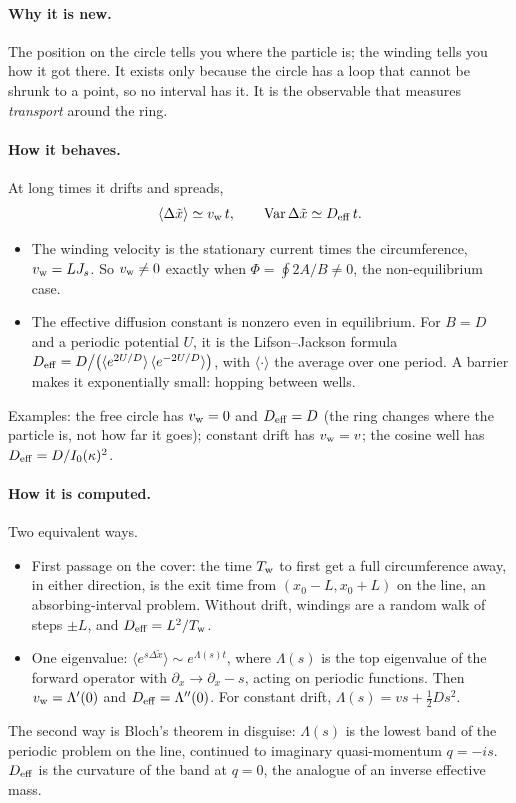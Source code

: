 \documentclass[11pt]{article}
\begin{document}
\paragraph{Why it is new.} The position on the circle tells you where the particle is; the winding tells you how it got
there. It exists only because the circle has a loop that cannot be shrunk to a point, so no interval has it. It is the
observable that measures \emph{transport} around the ring.

\paragraph{How it behaves.} At long times it drifts and spreads,
\[
  \langle\Delta\tilde x\rangle\simeq v_{\rm w}\,t,\qquad \operatorname{Var}\Delta\tilde x\simeq D_{\rm eff}\,t .
\]
\begin{itemize}
  \item The winding velocity is the stationary current times the circumference, $v_{\rm w}=LJ_s$. So $v_{\rm w}\neq0$
        exactly when $\Phi=\oint2A/B\neq0$, the non-equilibrium case.
  \item The effective diffusion constant is nonzero even in equilibrium. For $B=D$ and a periodic potential $U$, it is the
        Lifson--Jackson formula
        $D_{\rm eff}=D\big/\bigl(\langle e^{2U/D}\rangle\,\langle e^{-2U/D}\rangle\bigr)$, with $\langle\cdot\rangle$ the
        average over one period. A barrier makes it exponentially small: hopping between wells.
\end{itemize}
Examples: the free circle has $v_{\rm w}=0$ and $D_{\rm eff}=D$ (the ring changes where the particle is, not how far it
goes); constant drift has $v_{\rm w}=v$; the cosine well has $D_{\rm eff}=D/I_0(\kappa)^2$.

\paragraph{How it is computed.} Two equivalent ways.
\begin{itemize}
  \item First passage on the cover: the time $T_{\rm w}$ to first get a full circumference away, in either direction, is the
        exit time from $(x_0-L,x_0+L)$ on the line, an absorbing-interval problem. Without drift, windings are a random
        walk of steps $\pm L$, and $D_{\rm eff}=L^2/T_{\rm w}$.
  \item One eigenvalue: $\langle e^{s\Delta\tilde x}\rangle\sim e^{\Lambda(s)t}$, where $\Lambda(s)$ is the top
        eigenvalue of the forward operator with $\partial_x\to\partial_x-s$, acting on periodic functions. Then
        $v_{\rm w}=\Lambda'(0)$ and $D_{\rm eff}=\Lambda''(0)$. For constant drift, $\Lambda(s)=vs+\frac12Ds^2$.
\end{itemize}
The second way is Bloch's theorem in disguise: $\Lambda(s)$ is the lowest band of the periodic problem on the line,
continued to imaginary quasi-momentum $q=-is$. $D_{\rm eff}$ is the curvature of the band at $q=0$, the analogue of an
inverse effective mass.
\end{document}
